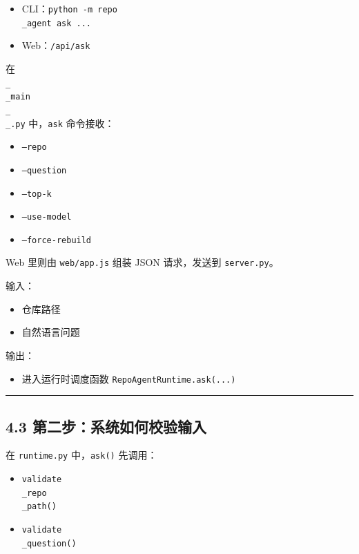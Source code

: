 \documentclass[UTF8,12pt,openany]{ctexbook}
\begin{document}
\begin{itemize}
\item CLI：\texttt{python -m repo\\_agent ask ...}
\item Web：\texttt{/api/ask}
\end{itemize}

在 \texttt{\\_\\_main\\_\\_.py} 中，\texttt{ask} 命令接收：\par

\begin{itemize}
\item \texttt{--repo}
\item \texttt{--question}
\item \texttt{--top-k}
\item \texttt{--use-model}
\item \texttt{--force-rebuild}
\end{itemize}

Web 里则由 \texttt{web/app.js} 组装 JSON 请求，发送到 \texttt{server.py}。\par

输入：\par

\begin{itemize}
\item 仓库路径
\item 自然语言问题
\end{itemize}

输出：\par

\begin{itemize}
\item 进入运行时调度函数 \texttt{RepoAgentRuntime.ask(...)}
\end{itemize}

\hrule

\subsection{4.3 第二步：系统如何校验输入}

在 \texttt{runtime.py} 中，\texttt{ask()} 先调用：\par

\begin{itemize}
\item \texttt{validate\\_repo\\_path()}
\item \texttt{validate\\_question()}
\end{itemize}
\end{document}
